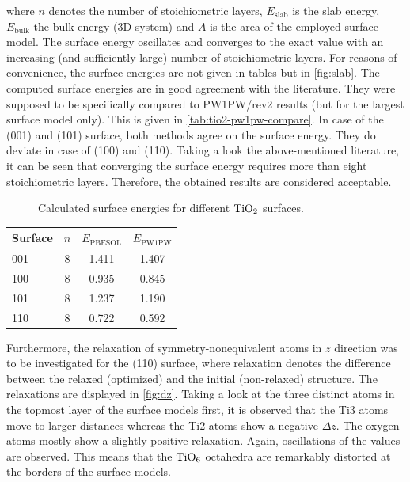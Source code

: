\documentclass[a4paper,12pt]{scrartcl}
\begin{document}
where $ n $ denotes the number of stoichiometric layers, $ E_\mathrm{slab} $ is the slab energy, $ E_\mathrm{bulk} $ the bulk energy (3D system) and $ A $ is the area of the employed surface model. The surface energy oscillates and converges to the exact value with an increasing (and sufficiently large) number of stoichiometric layers. For reasons of convenience, the surface energies are not given in tables but in \autoref{fig:slab}. The computed surface energies are in good agreement with the literature.\autocite{rutile-surface-energy} They were supposed to be specifically compared to PW1PW/rev2 results (but for the largest surface model only). This is given in \autoref{tab:tio2-pw1pw-compare}. In case of the (001) and (101) surface, both methods agree on the surface energy. They do deviate in case of (100) and (110). Taking a look the above-mentioned literature, it can be seen that converging the surface energy requires more than eight stoichiometric layers. Therefore, the obtained results are considered acceptable. 
%
\begin{figure}[H]
	\centering
	
	\vspace{-20pt}
	\caption{Calculated surface energies for different $ \ce{TiO2} $ surfaces.}
	\label{fig:slab}
\end{figure}
%
\begin{table}[H]
	\centering
	\label{tab:tio2-pw1pw-compare}
	\begin{tabular}{lccc}
		\toprule
		Surface & $n$ & $ E_\mathrm{PBESOL}$ & $ E_\mathrm{PW1PW} $ \\
		\midrule
		001     & 8 & 1.411     & 1.407    \\
		100     & 8 & 0.935     & 0.845    \\
		101     & 8 & 1.237     & 1.190    \\
		110     & 8 & 0.722     & 0.592    \\
		\bottomrule
	\end{tabular}
\end{table}
%
Furthermore, the relaxation of symmetry-nonequivalent atoms in $ z $ direction was to be investigated for the (110) surface, where relaxation denotes the difference between the relaxed (optimized) and the initial (non-relaxed) structure. The relaxations are displayed in \autoref{fig:dz}. Taking a look at the three distinct atoms in the topmost layer of the surface models first, it is observed that the Ti3 atoms move to larger distances whereas the Ti2 atoms show a negative $ \Delta z $. The oxygen atoms mostly show a slightly positive relaxation. Again, oscillations of the values are observed. This means that the $ \ce{TiO6} $ octahedra are remarkably distorted at the borders of the surface models. 
\end{document}
